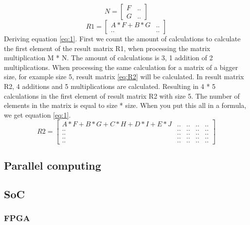 \begin{equation}
	N =	\begin{bmatrix}
	F & .. \\[0.2em]
	G & ..
	\end{bmatrix}
\end{equation}
\begin{equation} \label{eq:R1}
	R1 =	\begin{bmatrix}
	A*F+B*G & .. \\[0.2em]
	.. & ..
	\end{bmatrix}
\end{equation}
Deriving equation \ref{eq:1}. First we count the amount of calculations to calculate the first element of the result matrix R1, when processing the matrix multiplication M * N. The amount of calculations is 3, 1 addition of 2 multiplications. When processing the same calculation for a matrix of a bigger size, for example size 5, result matrix \ref{eq:R2} will be calculated. In result matrix R2, 4 additions and 5 multiplications are calculated. Resulting in 4 * 5 calculations in the first element of result matrix R2 with size 5. The number of elements in the matrix is equal to size * size. When you put this all in a formula, we get equation \ref{eq:1}.
\begin{equation} \label{eq:R2}
	R2 =	\begin{bmatrix}
	A*F+B*G+C*H+D*I+E*J & .. & .. & .. & .. \\[0.5em]
	.. & .. & .. & .. & .. \\[0.5em]
	.. & .. & .. & .. & .. \\[0.5em]
	.. & .. & .. & .. & .. \\[0.5em]
	.. & .. & .. & .. & ..
	\end{bmatrix}
\end{equation}
	\subsection{Parallel computing}
	\subsection{SoC}
		\subsubsection{FPGA}
